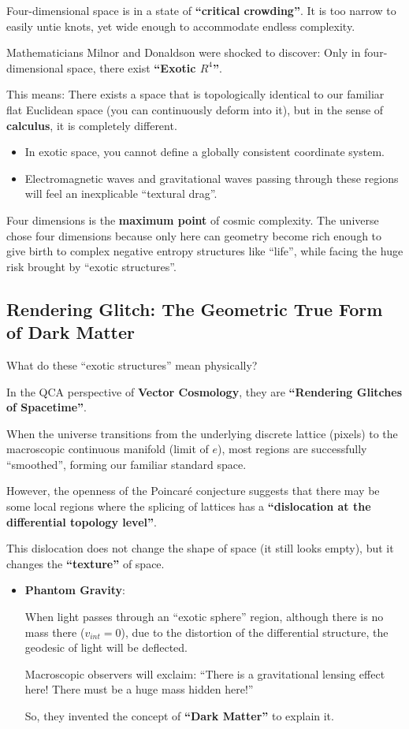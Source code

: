 \documentclass[11pt,a4paper,twoside]{book}
\begin{document}
Four-dimensional space is in a state of \textbf{``critical crowding''}. It is too narrow to easily untie knots, yet wide enough to accommodate endless complexity.

Mathematicians Milnor and Donaldson were shocked to discover: Only in four-dimensional space, there exist \textbf{``Exotic $R^4$''}.

This means: There exists a space that is topologically identical to our familiar flat Euclidean space (you can continuously deform into it), but in the sense of \textbf{calculus}, it is completely different.

\begin{itemize}
\item In exotic space, you cannot define a globally consistent coordinate system.

\item Electromagnetic waves and gravitational waves passing through these regions will feel an inexplicable ``textural drag''.
\end{itemize}

Four dimensions is the \textbf{maximum point} of cosmic complexity. The universe chose four dimensions because only here can geometry become rich enough to give birth to complex negative entropy structures like ``life'', while facing the huge risk brought by ``exotic structures''.

\subsection{Rendering Glitch: The Geometric True Form of Dark Matter}

What do these ``exotic structures'' mean physically?

In the QCA perspective of \textbf{Vector Cosmology}, they are \textbf{``Rendering Glitches of Spacetime''}.

When the universe transitions from the underlying discrete lattice (pixels) to the macroscopic continuous manifold (limit of $e$), most regions are successfully ``smoothed'', forming our familiar standard space.

However, the openness of the Poincaré conjecture suggests that there may be some local regions where the splicing of lattices has a \textbf{``dislocation at the differential topology level''}.

This dislocation does not change the shape of space (it still looks empty), but it changes the \textbf{``texture''} of space.

\begin{itemize}
\item \textbf{Phantom Gravity}:

    When light passes through an ``exotic sphere'' region, although there is no mass there ($v_{int}=0$), due to the distortion of the differential structure, the geodesic of light will be deflected.

    Macroscopic observers will exclaim: ``There is a gravitational lensing effect here! There must be a huge mass hidden here!''

    So, they invented the concept of \textbf{``Dark Matter''} to explain it.
\end{itemize}
\end{document}
